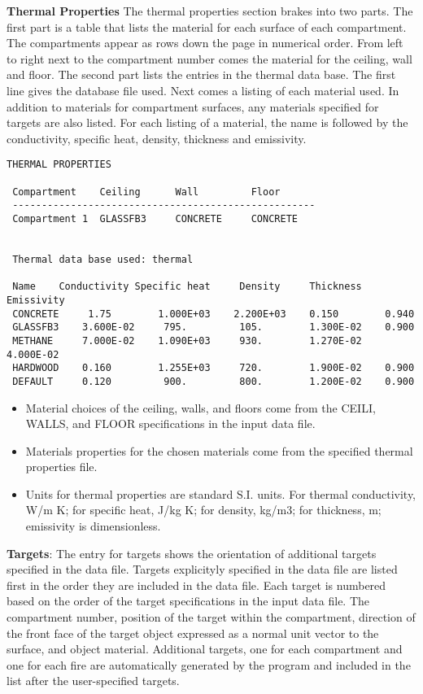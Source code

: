 \textbf{Thermal Properties} The thermal properties section brakes into two parts.  The first part is a table that lists the material for each surface of each compartment.  The compartments appear as rows down the page in numerical order.  From left to right next to the compartment number comes the material for the ceiling, wall and floor.  The second part lists the entries in the thermal data base.  The first line gives the database file used.  Next comes a listing of each material used. In addition to materials for compartment surfaces, any materials specified for targets are also listed.  For each listing of a material, the name is followed by the conductivity, specific heat, density, thickness and emissivity. 

\begin{lstlisting}[basicstyle=\tiny]
 THERMAL PROPERTIES

 Compartment    Ceiling      Wall         Floor
 ----------------------------------------------------
 Compartment 1  GLASSFB3     CONCRETE     CONCRETE


 Thermal data base used: thermal

 Name    Conductivity Specific heat     Density     Thickness   Emissivity
 CONCRETE     1.75        1.000E+03    2.200E+03    0.150        0.940
 GLASSFB3    3.600E-02     795.         105.        1.300E-02    0.900
 METHANE     7.000E-02    1.090E+03     930.        1.270E-02    4.000E-02
 HARDWOOD    0.160        1.255E+03     720.        1.900E-02    0.900
 DEFAULT     0.120         900.         800.        1.200E-02    0.900
\end{lstlisting}

\begin{itemize}
\item Material choices of the ceiling, walls, and floors come from the CEILI, WALLS, and FLOOR specifications in the input data file.
\item Materials properties for the chosen materials come from the specified thermal properties file.
\item Units for thermal properties are standard S.I. units.  For thermal conductivity, W/m K; for specific heat, J/kg K; for density, kg/m3; for thickness, m; emissivity is dimensionless.
\end{itemize}

\textbf{Targets}: The entry for targets shows the orientation of additional targets specified in the data file. Targets explicityly specified in the data file are listed first in the order they are included in the data file.  Each target is numbered based on the order of the target specifications in the input data file.  The compartment number, position of the target within the compartment, direction of the front face of the target object expressed as a normal unit vector to the surface, and object material. Additional targets, one for each compartment and one for each fire are automatically generated by the program and included in the list after the user-specified targets.

